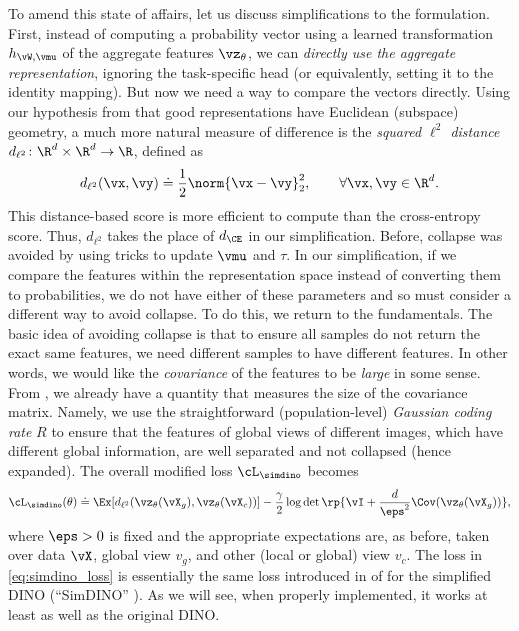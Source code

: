 \documentclass[../../book-main.tex]{subfiles}
\begin{document}
To amend this state of affairs, let us discuss simplifications to the
formulation.
First, instead of computing a probability vector using a
learned transformation \(h_{\vW, \vmu}\) of the aggregate features
\(\vz_{\theta}\), we can \textit{directly use the aggregate
representation}, ignoring the task-specific head (or equivalently,
setting it to the identity mapping).
But now we need a way to compare
the vectors directly.
Using our hypothesis from
 that good representations have
Euclidean (subspace) geometry, a much more natural measure of
difference is the \textit{squared \(\ell^{2}\) distance}
\(d_{\ell^{2}} \colon \R^{d} \times \R^{d} \to \R\), defined as
\begin{equation}\label{eq:cosine_similarity}
    d_{\ell^{2}}(\vx, \vy) \doteq \frac{1}{2}\norm{\vx -
    \vy}_{2}^{2}, \qquad  \forall \vx, \vy \in \R^{d} .
\end{equation}
This distance-based score is more efficient to compute than the
cross-entropy score. Thus, \(d_{\ell^{2}}\) takes the place of
\(d_{\CE}\) in our simplification.
Before, collapse was avoided by using tricks to update \(\vmu\) and
\(\tau\).
In our simplification, if we compare the features within
the representation space instead of converting them to probabilities,
we do not have either of these parameters and so must consider a
different way to avoid collapse.
To do this, we return to the
fundamentals. The basic idea of avoiding collapse is that to ensure
all samples do not return the exact same features, we need different
samples to have different features.
In other words, we would like the
\textit{covariance} of the features to be \textit{large} in some
sense.
From , we already
have a quantity that measures the size of the covariance matrix.
Namely, we use the straightforward (population-level)
\textit{Gaussian coding rate} \(R\) to ensure that the features of
global views of different images, which have different global
information, are well separated and not collapsed (hence expanded).
The overall modified loss \(\cL_{\simdino}\) becomes
\begin{equation}\label{eq:simdino_loss}
    \cL_{\simdino}(\theta) \doteq \Ex[d_{\ell^{2}}(\vz_{\theta}(\vX_{g}),
    \vz_{\theta}(\vX_{c}))] - \frac{\gamma}{2}\log\det\rp{\vI +
    \frac{d}{\eps^{2}}\Cov(\vz_{\theta}(\vX_{g}))} ,
\end{equation}
where \(\eps > 0\) is fixed and the appropriate expectations are, as
before, taken over data \(\vX\), global view \(v_{g}\), and other
(local or global) view \(v_{c}\).
The loss in \eqref{eq:simdino_loss}
is essentially the same loss introduced in  of
 for the simplified DINO
(``SimDINO'' \citep{wu2025simplifying}).
As we will see, when properly implemented,
it works at least as well as the original DINO.
\end{document}

